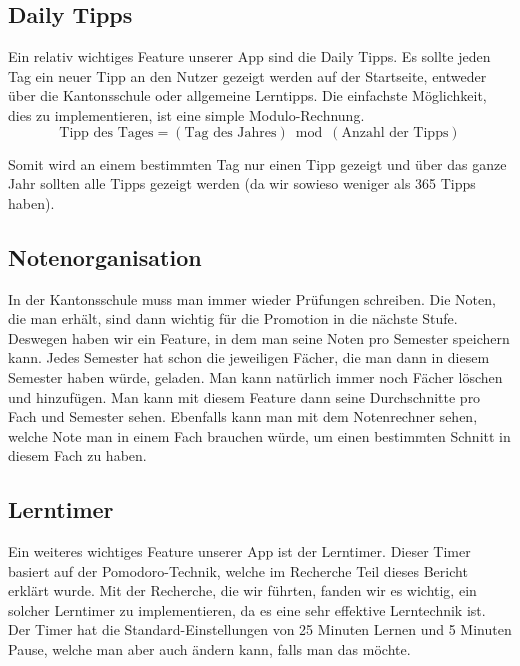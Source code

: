 \documentclass[12pt,a4paper]{report}
\begin{document}
\subsection{Daily Tipps}
Ein relativ wichtiges Feature unserer App sind die Daily Tipps. Es sollte jeden Tag ein neuer Tipp an den Nutzer gezeigt werden auf der Startseite, entweder über die Kantonsschule oder allgemeine Lerntipps. Die einfachste Möglichkeit, dies zu implementieren, ist eine simple Modulo-Rechnung. 
\[
\text{Tipp des Tages} = (\text{Tag des Jahres}) \bmod (\text{Anzahl der Tipps})
\]

Somit wird an einem bestimmten Tag nur einen Tipp gezeigt und über das ganze Jahr sollten alle Tipps gezeigt werden (da wir sowieso weniger als 365 Tipps haben).



\subsection{Notenorganisation}
In der Kantonsschule muss man immer wieder Prüfungen schreiben. Die Noten, die man erhält, sind dann wichtig für die Promotion in die nächste Stufe. Deswegen haben wir ein Feature, in dem man seine Noten pro Semester speichern kann. Jedes Semester hat schon die jeweiligen Fächer, die man dann in diesem Semester haben würde, geladen. Man kann natürlich immer noch Fächer löschen und hinzufügen. Man kann mit diesem Feature dann seine Durchschnitte pro Fach und Semester sehen. Ebenfalls kann man mit dem Notenrechner sehen, welche Note man in einem Fach brauchen würde, um einen bestimmten Schnitt in diesem Fach zu haben.

\subsection{Lerntimer}
Ein weiteres wichtiges Feature unserer App ist der Lerntimer. Dieser Timer basiert auf der Pomodoro-Technik, welche im Recherche Teil dieses Bericht erklärt wurde. Mit der Recherche, die wir führten, fanden wir es wichtig, ein solcher Lerntimer zu implementieren, da es eine sehr effektive Lerntechnik ist. Der Timer hat die Standard-Einstellungen von 25 Minuten Lernen und 5 Minuten Pause, welche man aber auch ändern kann, falls man das möchte.
\end{document}
